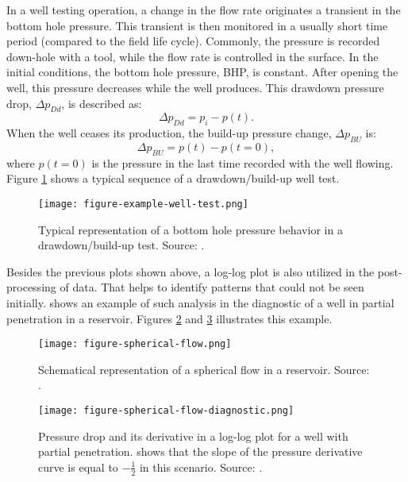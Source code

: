 In a well testing operation, a change in the flow rate originates a transient in the bottom hole pressure.
%
This transient is then monitored in a usually short time period (compared to the field life cycle).
%
Commonly, the pressure is recorded down-hole with a tool, while the flow rate is controlled in the surface.
%
In the initial conditions, the bottom hole pressure, BHP, is constant.
%
After opening the well, this pressure decreases while the well produces.
%
This drawdown pressure drop, $\Delta p_{Dd}$, is described as:
%
%
\begin{equation}
	\Delta p_{Dd} = p_i - p(t).
\end{equation}
%
When the well ceases its production, the build-up pressure change, $\Delta p_{BU}$ is:
%
\begin{equation}
	\Delta p_{BU} = p(t) - p(t=0),
\end{equation}
%
where $p(t=0)$ is the pressure in the last time recorded with the well flowing.
%
Figure \ref{figure-example-well-test} shows a typical sequence of a drawdown/build-up well test.
%
\begin{figure}[H]
	\centering
	\texttt{[image: figure-example-well-test.png]}
	\caption{Typical representation of a bottom hole pressure behavior in a drawdown/build-up test. Source: \cite{Bourdet2002}.}
	\label{figure-example-well-test}
\end{figure}
\noindent
%
Besides the previous plots shown above, a log-log plot is also utilized in the post-processing of data. 
%
That helps to identify patterns that could not be seen initially. 
%
\cite{Bourdet2002} shows an example of such analysis in the diagnostic of a well in partial penetration in a reservoir.
%
Figures \ref{figure-spherical-flow} and \ref{figure-spherical-flow-diagnostic} illustrates this example.
%
\begin{figure}[H]
	\centering
	\texttt{[image: figure-spherical-flow.png]}
	\caption{Schematical representation of a spherical flow in a reservoir. Source: \cite{Bourdet2002}.}
	\label{figure-spherical-flow}
\end{figure}
%
\begin{figure}[H]
	\centering
	\texttt{[image: figure-spherical-flow-diagnostic.png]}
	\caption{Pressure drop and its derivative in a log-log plot for a well with partial penetration. \cite{Bourdet2002} shows that the slope of the pressure derivative curve is equal to $-\frac{1}{2}$ in this scenario. Source: \cite{Bourdet2002}.}
	\label{figure-spherical-flow-diagnostic}
\end{figure}
